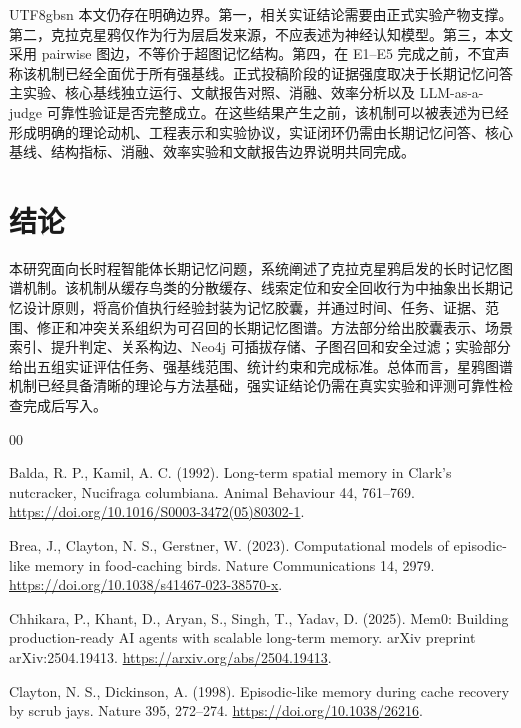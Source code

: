 \documentclass[a4paper,fleqn]{cas-sc}
\begin{document}
\begin{CJK*}{UTF8}{gbsn}
本文仍存在明确边界。第一，相关实证结论需要由正式实验产物支撑。第二，克拉克星鸦仅作为行为层启发来源，不应表述为神经认知模型。第三，本文采用 pairwise 图边，不等价于超图记忆结构。第四，在 E1--E5 完成之前，不宜声称该机制已经全面优于所有强基线。正式投稿阶段的证据强度取决于长期记忆问答主实验、核心基线独立运行、文献报告对照、消融、效率分析以及 LLM-as-a-judge 可靠性验证是否完整成立。在这些结果产生之前，该机制可以被表述为已经形成明确的理论动机、工程表示和实验协议，实证闭环仍需由长期记忆问答、核心基线、结构指标、消融、效率实验和文献报告边界说明共同完成。

\section{结论}

本研究面向长时程智能体长期记忆问题，系统阐述了克拉克星鸦启发的长时记忆图谱机制。该机制从缓存鸟类的分散缓存、线索定位和安全回收行为中抽象出长期记忆设计原则，将高价值执行经验封装为记忆胶囊，并通过时间、任务、证据、范围、修正和冲突关系组织为可召回的长期记忆图谱。方法部分给出胶囊表示、场景索引、提升判定、关系构边、Neo4j 可插拔存储、子图召回和安全过滤；实验部分给出五组实证评估任务、强基线范围、统计约束和完成标准。总体而言，星鸦图谱机制已经具备清晰的理论与方法基础，强实证结论仍需在真实实验和评测可靠性检查完成后写入。

\begin{thebibliography}{00}

Balda, R. P., Kamil, A. C. (1992). Long-term spatial memory in Clark's nutcracker, Nucifraga columbiana. Animal Behaviour 44, 761--769. \url{https://doi.org/10.1016/S0003-3472(05)80302-1}.

Brea, J., Clayton, N. S., Gerstner, W. (2023). Computational models of episodic-like memory in food-caching birds. Nature Communications 14, 2979. \url{https://doi.org/10.1038/s41467-023-38570-x}.

Chhikara, P., Khant, D., Aryan, S., Singh, T., Yadav, D. (2025). Mem0: Building production-ready AI agents with scalable long-term memory. arXiv preprint arXiv:2504.19413. \url{https://arxiv.org/abs/2504.19413}.

Clayton, N. S., Dickinson, A. (1998). Episodic-like memory during cache recovery by scrub jays. Nature 395, 272--274. \url{https://doi.org/10.1038/26216}.


\end{thebibliography}
\end{CJK*}
\end{document}
